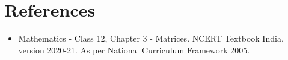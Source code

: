 \documentclass[12pt, letterpaper]{article}
\begin{document}
\section{References}
\begin{itemize}
    \item Mathematics - Class 12, Chapter 3 - Matrices. NCERT Textbook India, version 2020-21. As per National Curriculum Framework 2005.
\end{itemize}
\end{document}
